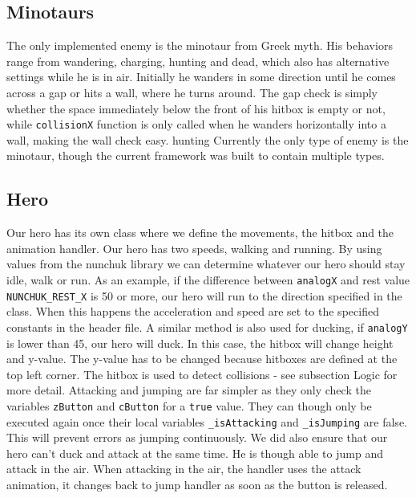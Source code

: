 \subsection{Minotaurs} %
The only implemented enemy is the minotaur from Greek myth. His behaviors range from wandering, charging, hunting and dead, which also has alternative settings while he is in air. Initially he wanders in some direction until he comes across a gap or hits a wall, where he turns around. The gap check is simply whether the space immediately below the front of his hitbox is empty or not, while {\tt collisionX} function is only called when he wanders horizontally into a wall, making the wall check easy.
hunting
\newline
Currently the only type of enemy is the minotaur, though the current framework was built to contain multiple types.

\subsection{Hero}
Our hero has its own class where we define the movements, the hitbox and
the animation handler.
\newline
Our hero has two speeds, walking and running. By using values from the nunchuk library we can determine whatever our hero should stay idle, walk or run. As an example, if the difference between {\tt analogX} and rest value {\tt NUNCHUK\_REST\_X} is 50 or more, our hero will run to the direction specified in the class. When this happens the acceleration and speed are set to the specified constants in the header file.  A similar method is also used for ducking, if {\tt analogY} is lower than 45, our hero will duck. In this case, the hitbox will change height and y-value. The y-value has to be changed because hitboxes are defined at the top left corner. The hitbox is used to detect collisions - see subsection Logic for more detail.
\newline
Attacking and jumping are far simpler as they only check the variables {\tt zButton} and {\tt cButton} for a {\tt true} value. They can though only be executed again once their local variables {\tt \_isAttacking} and {\tt \_isJumping} are false. This will prevent errors as jumping continuously. We did also ensure that our hero can't duck and attack at the same time. He is though able to jump and attack in the air. When attacking in the air, the handler uses the attack animation, it changes back to jump handler as soon as the button is released.

